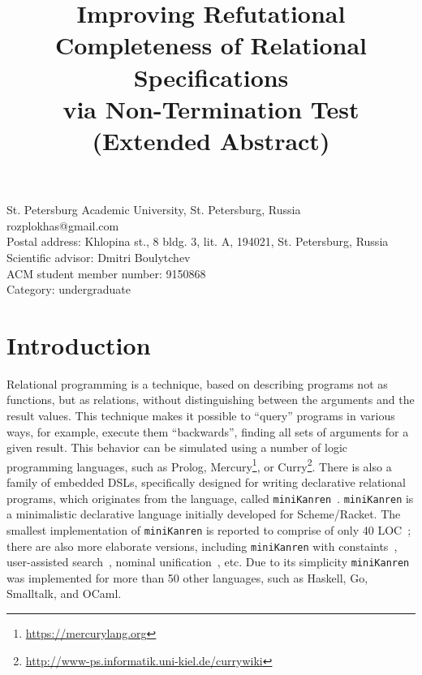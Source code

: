 \documentclass[preprint,numbers,10pt]{sigplanconf}
\newcommand{\miniKanren}{\texttt{miniKanren}\xspace}
\begin{document}

\title{Improving Refutational Completeness of Relational Specifications\\
via Non-Termination Test\\
{\small (Extended Abstract)}}

{St. Petersburg Academic University, St. Petersburg, Russia}
{rozplokhas@gmail.com\\
Postal address: Khlopina st., 8 bldg. 3, lit. A, 194021, St. Petersburg, Russia\\
Scientific advisor: Dmitri Boulytchev\\
ACM student member number: 9150868\\
Category: undergraduate
}


\maketitle

\section{Introduction}

Relational programming is a technique, based on describing programs not as functions, but 
as relations, without distinguishing between the arguments and the result values. This technique makes it 
possible to ``query'' programs in various ways, for example, execute them ``backwards'', finding
all sets of arguments for a given result. This behavior can be simulated using a number of
logic programming languages, such as Prolog, Mercury\footnote{\url{https://mercurylang.org}}, 
or Curry\footnote{\url{http://www-ps.informatik.uni-kiel.de/currywiki}}. 
There is also a family of embedded DSLs, specifically designed for writing declarative relational
programs, which originates from the language, called \miniKanren~\cite{TRS}. \miniKanren is a minimalistic 
declarative language initially developed for Scheme/Racket. The smallest implementation of \miniKanren 
is reported to comprise of only 40 LOC~\cite{MicroKanren, 2016}; there are also more elaborate versions, including
\miniKanren with constaints~\cite{CKanren, CKanren1}, user-assisted search~\cite{Guided}, nominal unification~\cite{AlphaKanren},
etc. Due to its simplicity \miniKanren was implemented for more than 50 other languages, such as
Haskell, Go, Smalltalk, and OCaml.
\end{document}
